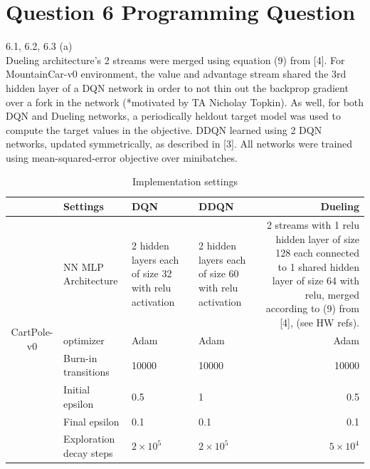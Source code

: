 \documentclass[12pt]{article}
\begin{document}
\section*{Question 6 Programming Question}
    \begin{tcolorbox}[fit,height=22cm, width=\textwidth, blank, borderline={1pt}{-2pt},nobeforeafter]
    {\large 6.1, 6.2, 6.3 (a)}\\
    {\large *Dueling architecture's 2 streams were merged using equation (9) from [4]. For MountainCar-v0 environment, the value and advantage stream shared the 3rd hidden layer of a DQN network in order to not thin out the backprop gradient over a fork in the network (*motivated by TA Nicholay Topkin). As well, for both DQN and Dueling networks, a periodically heldout target model was used to compute the target values in the objective. DDQN learned using 2 DQN networks, updated symmetrically, as described in [3]. All networks were trained using mean-squared-error objective over minibatches.}
	\begin{table}[H]
		\centering
		\caption{Implementation settings}
		\begin{tabular}{|c|p{7.785em}|l|l|r|}
			\cline{2-5}    \multicolumn{1}{r|}{} & Settings & \multicolumn{1}{p{7.93em}|}{DQN} & \multicolumn{1}{p{7.93em}|}{DDQN} & \multicolumn{1}{p{7.5em}|}{Dueling} \\
			\hline
			\multirow{10}[20]{*}{\begin{sideways}CartPole-v0\end{sideways}} & NN MLP Architecture  & \multicolumn{1}{p{7.93em}|}{2 hidden layers each of size 32 with relu activation} & \multicolumn{1}{p{7.93em}|}{2 hidden layers each of size 60 with relu activation} & \multicolumn{1}{p{7.93em}|}{2 streams with 1 relu hidden layer of size 128 each connected to 1 shared hidden layer of size 64 with relu, merged according to (9) from [4], (see HW refs).} \\
			\cline{2-5}          & optimizer & \multicolumn{1}{p{7.93em}|}{Adam} & \multicolumn{1}{p{7.93em}|}{Adam} & \multicolumn{1}{p{7.93em}|}{Adam} \\
			\cline{2-5}          & Burn-in transitions & 10000 & 10000 &  10000 \\
			\cline{2-5}          & Initial epsilon & 0.5   & 1     & 0.5 \\
			\cline{2-5}          & Final epsilon & 0.1   & 0.1   & 0.1 \\
			\cline{2-5}          & Exploration decay steps & \multicolumn{1}{p{7.93em}|}{$2\times10^5$} & \multicolumn{1}{p{7.93em}|}{$2\times10^5$} & \multicolumn{1}{p{7.93em}|}{$5\times10^4$} \\

\end{tabular}
\end{table}
\end{tcolorbox}
\end{document}
